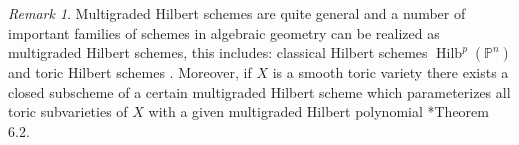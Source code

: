 \documentclass[11pt,reqno]{amsart}
\theoremstyle{remark}
\newtheorem{remark}[lemma]{Remark}
\newcommand{\Hilb}{\operatorname{Hilb}}
\newcommand{\zero}{\mathbf 0}
\newcommand{\K}{\mathbb{K}}
\renewcommand{\P}{\mathbb{P}}
\newcommand{\Z}{\mathbb{Z}}
\begin{document}
% 

\begin{remark}
	Multigraded Hilbert schemes are quite general and a number of important families of schemes in algebraic geometry can be realized as multigraded Hilbert schemes, this includes: classical Hilbert schemes $\Hilb^{p}(\P^{n})$ and toric Hilbert schemes \cite{peevaStilmann02}. Moreover, if $X$ is a smooth toric variety there exists a closed subscheme of a certain multigraded Hilbert scheme which parameterizes all toric subvarieties of $X$ with a given multigraded Hilbert polynomial \cite{maclaganSmith05}*{Theorem 6.2}.
\end{remark}
\end{document}

